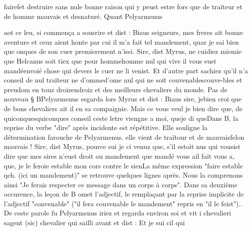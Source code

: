 \documentclass{article}
\begin{document}
\begin{pages}
                     fairefet destruire sans nule bonne raison qui y peust estre fors que de traïteur et
                  de homme 
                     mauvais et desnaturé. \pend
            \pstart 
               Quant Pelyarmenus
               
                  aot ce leu, si commença a sousrire et dist : Biaus seigneurs, mes freres ait bonne
                  aventure et ceuz aient honte par cui il m’a fait tel mandement, quar je sai bien
                  que onques de son cuer premierement n’issi.
               Sire, dist Myrus,
                  ne cuidiez 
                     miemie que
                  Helcanus soit tiex que
                  pour 
                     hommehomme nul qui vive il vous eust 
                     mandéenvoié chose qui devers le cuer ne li venist. Et d’autre part sachiez qu’il n’a conseil de nul traïteur ne 
                     d’ommed'ome nul qui ne soit 
                     couvenablescouve-bles et preudom en touz 
                     droizendroiz et des meilleurs chevaliers du monde. \pend
            \pstart Pas de nouveau § BPelyarmenus esgarda lors Myrus et dist : Biaus sire, 
                     jebien croi que de bons chevaliers ait il en sa compaignie. Mais ce vous veul je
                  bien dire que, de 
                        quiconquesquiconques conseil ceste letre viengne a moi, 
                        queje di queDans B, la reprise du verbe "dire" après
                        incidente est répétitive. Elle souligne la détermination farouche de
                        Pelyarmenus. elle vient de traïtour et de 
                        mauvaisfelon mauvais !
               Sire, dist Myrus,
                  pource sui je ci venuz que, s’il estoit nus qui vousist dire que mes sires
                     n’eust droit ou mandement que
                         mandé vous ail fait vous a, que, je le feroie estable mon cors contre le sienLa même expression "faire estable qch. (ici un mandement)"
                     se retrouve quelques lignes après. Nous la comprenons ainsi "Je ferais
                     respecter ce message dans un corps à corps". Dans sa deuxième occurence, la
                     leçon de B omet l'adjectif, le remplaçant par la reprise implicite de
                     l'adjectif "convenable" ("il fera couvenable le mandement" repris en "il le
                     feist")..
               De ceste parole fu Pelyarmenus iriez et
               regarda environ soi et vit 
                  i
                        chevalieri sagent (sic) chevalier qui sailli avant et dist : Et je sui cil qui

\end{pages}
\end{document}
